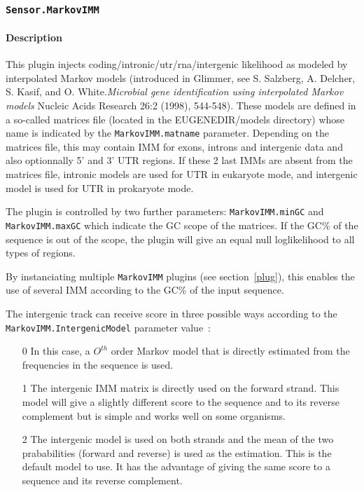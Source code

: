 
\subsubsection{\texttt{Sensor.MarkovIMM}}

\paragraph{Description}

This plugin injects coding/intronic/utr/rna/intergenic likelihood as
modeled by interpolated Markov models (introduced in Glimmer, see S.
Salzberg, A. Delcher, S. Kasif, and O. White.{\em Microbial gene
  identification using interpolated Markov models} Nucleic Acids
Research 26:2 (1998), 544-548). These models are defined in a
so-called matrices file (located in the EUGENEDIR/models directory) whose name is indicated by the
\texttt{MarkovIMM.matname} parameter. Depending on the matrices file,
this may contain IMM for exons, introns and intergenic data and also
optionnally 5' and 3' UTR regions. If these 2 last IMMs are absent
from the matrices file, intronic models are used for UTR in eukaryote mode, and intergenic model is used for UTR in prokaryote mode.

The plugin is controlled by two further parameters:
\texttt{MarkovIMM.minGC} and \texttt{MarkovIMM.maxGC} which indicate
the GC scope of the matrices. If the GC\% of the sequence is out of
the scope, the plugin will give an equal null loglikelihood to all types
of regions.

By instanciating multiple \texttt{MarkovIMM} plugins (see
section~\ref{plug}), this enables the use of several IMM according to
the GC\% of the input sequence. 

The intergenic track can receive score in three possible ways
according to the \texttt{MarkovIMM.Interge\-nicModel} parameter value~:
\begin{enumerate}
\item[0] In this case, a $O^{th}$ order Markov model that is directly
  estimated from the frequencies in the sequence is used.
\item[1] The intergenic IMM matrix is directly used on the forward
  strand. This model will give a slightly different score to the
  sequence and to its reverse complement but is simple and works well
  on some organisms.
\item [2] The intergenic model is used on both strands and the mean of
  the two prababilities (forward and reverse) is used as the
  estimation. This is the default model to use. It has the advantage
  of giving the same score to a sequence and its reverse complement.
\end{enumerate}

